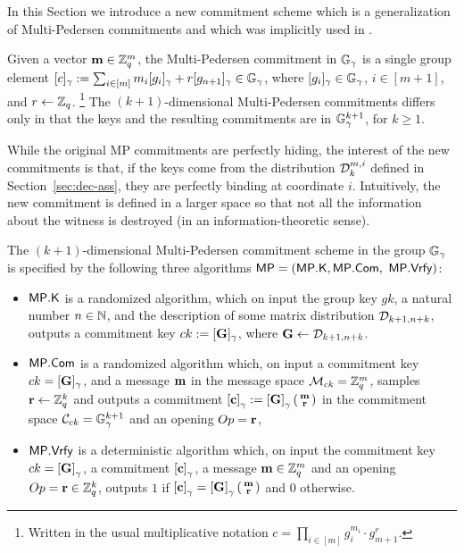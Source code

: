 In this Section we introduce a new commitment scheme which is a generalization of Multi-Pedersen commitments and which was implicitly used in \cite{EPRINT:GonHevRaf15}. 

Given a vector $\mathbf{m}\in\mathbb{Z}_q^m$, the Multi-Pedersen commitment in $\mathbb{G}_{\gamma}$ is a single group element $[c]_\gamma:=\sum_{i\in [m]} m_i[g_i]_\gamma+r[g_{n+1}]_\gamma \in\mathbb{G}_\gamma$, where $[g_i]_{\gamma}\in\mathbb{G}_\gamma$, $i\in[m+1]$, and $r\gets\mathbb{Z}_q$. \footnote{Written in the usual multiplicative notation $c=\prod_{i\in[m]}g_i^{m_i} \cdot g_{m+1}^r$.}  The $(k+1)$-dimensional Multi-Pedersen commitments 
differs only in that the keys and the resulting commitments are in 
$\mathbb{G}_{\gamma}^{k+1}$, for $k\geq 1$. 


While the original MP commitments are perfectly hiding, the interest of the new commitments is that, if the keys come from the distribution $\mathcal{D}_k^{m,i}$ defined in Section~\ref{sec:dec-ass}, they are perfectly binding at coordinate $i$. Intuitively, the new commitment is defined in a larger space so that not all the information about the witness is destroyed (in an information-theoretic sense). 

\begin{definition} The $(k+1)$-dimensional Multi-Pedersen commitment scheme in the group $\mathbb{G}_\gamma$ 
is specified by the following three algorithms 
	$\mathsf{MP}=(\mathsf{MP}.\mathsf{K},\mathsf{MP}.\mathsf{Com},$ $ \mathsf{MP}.\mathsf{Vrfy})$:
	\begin{itemize} 
		\item  $\mathsf{MP}.\mathsf{K}$ is a randomized algorithm, which on input the group key $gk$, a natural number $n \in \mathbb{N}$, and the description of some matrix distribution $\mathcal{D}_{k+1,n+k}$, 
		outputs a commitment key $ck:=[\mathbf{{G}}]_\gamma$, where $\mathbf{{G}} \gets \mathcal{D}_{k+1,n+k}$.
		\item $\mathsf{MP}.\mathsf{Com}$ is a randomized algorithm which, on input a commitment key $ck=[\mathbf{{G}}]_\gamma$, and a message 
		$\mathbf{m}$ in the message space $\mathcal{M}_{ck}=\mathbb{Z}_q^{m}$, samples $\mathbf{r} \gets \mathbb{Z}_q^k$ and outputs a commitment $\left[\mathbf{c}\right]_\gamma:=\left[\mathbf{{G}}\right]_\gamma\left(\begin{smallmatrix}\mathbf{m} \\ \mathbf{r}\end{smallmatrix}\right)$ in the commitment space $\mathcal{C}_{ck}=\mathbb{G}_\gamma^{k+1}$ and an opening $Op=\mathbf{r}$, 
		\item $\mathsf{MP}.\mathsf{Vrfy}$ is a deterministic algorithm which, on input the commitment key $ck=\left[\mathbf{{G}}\right]_\gamma$, a commitment $\left[\mathbf{c}\right]_\gamma$,  a message 
		$\mathbf{m} \in \mathbb{Z}_q^{m}$ and an opening $Op=\mathbf{r}\in\mathbb{Z}_q^k$, outputs $1$ if $\left[\mathbf{c}\right]_\gamma=\left[\mathbf{{G}}\right]_\gamma\left(\begin{smallmatrix}\mathbf{m} \\ \mathbf{r}\end{smallmatrix}\right)$
		and $0$ otherwise. 
	\end{itemize}
\end{definition}

